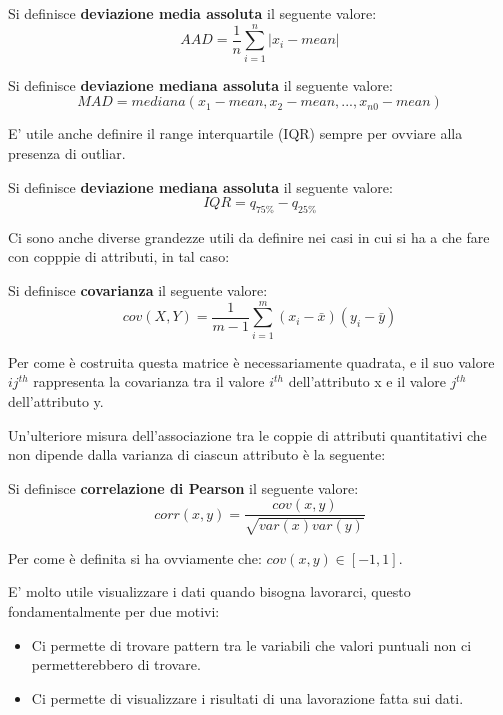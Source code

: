 \begin{defn}
	Si definisce \textbf{deviazione media assoluta} il seguente valore:
	\[ AAD =  \frac{1}{n}\sum_{i=1}^{n}|x_i- mean|\]
\end{defn}

\begin{defn}
	Si definisce \textbf{deviazione mediana assoluta} il seguente valore:
	\[ MAD = mediana(x_{1}-mean, x_{2}-mean, ..., x_{n0}-mean )\]
\end{defn}

E' utile anche definire il range interquartile (IQR) sempre per ovviare alla presenza di outliar.

\begin{defn}
	Si definisce \textbf{deviazione mediana assoluta} il seguente valore:
	\[ IQR = q_{75\%} - q_{25\%}\]
\end{defn}

Ci sono anche diverse grandezze utili da definire nei casi in cui si ha a che fare con copppie di attributi, in tal caso:

\begin{defn}
	Si definisce \textbf{covarianza} il seguente valore:
\[cov(X,Y) = \frac{1}{m -1}\sum_{i = 1}^{m} (x_{i} - \bar{x})(y_{i} - \bar{y})\]
\end{defn}

Per come è costruita questa matrice è necessariamente quadrata, e il suo valore $ij ^{th}$ rappresenta la covarianza tra il valore $i^{th}$ dell'attributo x e il valore $j^{th}$ dell'attributo y.

Un'ulteriore misura dell'associazione tra le coppie di attributi quantitativi che non dipende dalla varianza di ciascun attributo è la seguente:

\begin{defn}
	Si definisce \textbf{correlazione di Pearson} il seguente valore:
	\[ corr(x,y) = \frac{cov(x,y)}{\sqrt{var(x)var(y)}}\]
\end{defn} 
Per come è definita si ha ovviamente che: $cov(x,y) \in [-1,1]$.

E' molto utile visualizzare i dati quando bisogna lavorarci, questo fondamentalmente per due motivi:
\begin{itemize}
	\item Ci permette di trovare pattern tra le variabili che valori puntuali non ci permetterebbero di trovare.
	\item Ci permette di visualizzare i risultati di una lavorazione fatta sui dati.
\end{itemize}

